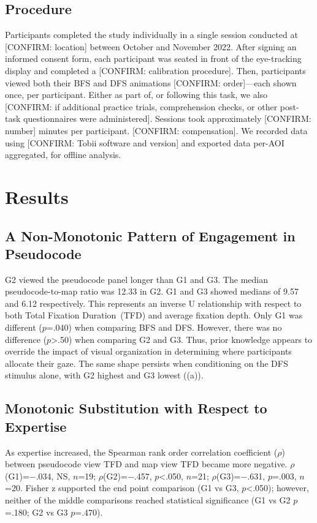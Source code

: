 \documentclass[journal]{vgtc}
\begin{document}
\subsection{Procedure}

Participants completed the study individually in a single session
conducted at [CONFIRM: location] between October and November 2022.
After signing an informed consent form, each participant was seated
in front of the eye-tracking display and completed a [CONFIRM:
calibration procedure]. Then, participants viewed both their BFS and
DFS animations [CONFIRM: order]---each shown once, per participant.
Either as part of, or following this task, we also [CONFIRM: if
additional practice trials, comprehension checks, or other post-task
questionnaires were administered]. Sessions took approximately
[CONFIRM: number] minutes per participant. [CONFIRM: compensation].
We recorded data using [CONFIRM: Tobii software and version] and
exported data per-AOI aggregated, for offline analysis.


\section{Results}

\subsection{A Non-Monotonic Pattern of Engagement in Pseudocode}
\label{sec:inverted}

G2 viewed the pseudocode panel longer than G1 and G3. The median
pseudocode-to-map ratio was 12.33 in G2. G1 and G3 showed medians of
9.57 and 6.12 respectively. This represents an inverse U relationship
with respect to both Total Fixation Duration~(TFD) and average
fixation depth. Only G1 was different ($p$=.040) when comparing BFS
and DFS. However, there was no difference ($p$>.50) when comparing
G2 and G3. Thus, prior knowledge appears to override the impact of
visual organization in determining where participants allocate their
gaze. The same shape persists when conditioning on the DFS stimulus
alone, with G2 highest and G3 lowest ((a)).

\subsection{Monotonic Substitution with Respect to Expertise}
\label{sec:reversal}

As expertise increased, the Spearman rank order correlation
coefficient ($\rho$) between pseudocode view TFD and map view TFD
became more negative. $\rho$(G1)=$-$.034, NS, $n$=19;
$\rho$(G2)=$-$.457, $p$<.050, $n$=21; $\rho$(G3)=$-$.631, $p$=.003,
$n$=20. Fisher z supported the end point comparison (G1 vs G3,
$p$<.050); however, neither of the middle comparisons reached
statistical significance (G1 vs G2 $p$=.180; G2 vs G3 $p$=.470).
\end{document}
